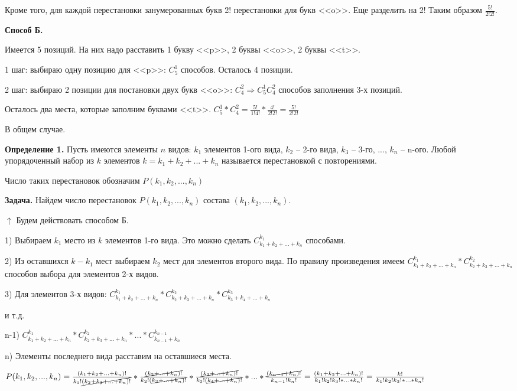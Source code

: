 \documentclass{article}
\begin{document}
    Кроме того, для каждой перестановки занумерованных букв 2! перестановки для букв <<o>>. Еще разделить на 2! Таким образом \(\frac{5!}{2!2!}\).

    \textbf{Способ Б.}

    Имеется 5 позиций. На них надо расставить 1 букву <<p>>, 2 буквы <<o>>, 2 буквы <<t>>.

    1 шаг: выбираю одну позицию для <<p>>: \(C_5^1\) способов. Осталось 4 позиции.

    2 шаг: выбираю 2 позиции для постановки двух букв <<o>>: \(C_4^2 \Rightarrow C_5^1C_4^2\) способов заполнения 3-х позиций.

    Осталось два места, которые заполним буквами <<t>>. \(C_5^1*C_4^2 = \frac{5!}{1!4!}*\frac{4!}{2!2!} = \frac{5!}{2!2!}\)

    В общем случае.

    \textbf{Определение 1.} Пусть имеются элементы \(n\) видов: \(k_1\) элементов 1-ого вида, \(k_2\) -- 2-го вида, \(k_3\) -- 3-го, ..., \(k_n\) -- n-ого. Любой упорядоченный набор из \(k\) элементов \(k = k_1 + k_2 + ... + k_n\) называется перестановкой с повторениями.

    Число таких перестановок обозначим \(P(k_1, k_2, ..., k_n)\)

    \textbf{Задача.} Найдем число перестановок \(P(k_1, k_2, ..., k_n)\) состава \((k_1, k_2, ..., k_n)\).
    
    \(\uparrow\) Будем действовать способом Б.

    1) Выбираем \(k_1\) место из \(k\) элементов 1-го вида. Это можно сделать \(C_{k_1+k_2+...+k_n}^{k_1}\) способами.

    2) Из оставшихся \(k - k_1\) мест выбираем \(k_2\) мест для элементов второго вида. По правилу произведения имеем \(C_{k_1+k_2+...+k_n}^{k_1}*C_{k_2+k_3+...+k_n}^{k_2}\) способов выбора для элементов 2-х видов.

    3) Для элементов 3-х видов: \(C_{k_1+k_2+...+k_n}^{k_1}*C_{k_2+k_3+...+k_n}^{k_2}*C_{k_3+k_4+...+k_n}^{k_3}\) 
    
    и т.д.

    n-1) \(C_{k_1+k_2+...+k_n}^{k_1}*C_{k_2+k_3+...+k_n}^{k_2}*...*C_{k_{n-1}+k_n}^{k_{n-1}}\)

    n) Элементы последнего вида расставим на оставшиеся места.

    \(P(k_1, k_2, ..., k_n) = \frac{(k_1 + k_2 + ... + k_n)!}{k_1!{\cancel{(k_2 + k_3 + ... + k_n)!}}}*\frac{\cancel{(k_2 + ... + k_n)!}}{k_2!(\cancel{k_3 + ... + k_n)!}}*\frac{\cancel{(k_3 + ... + k_n)!}}{k_3!(\cancel{k_4 + ... + k_n)!}}*...*\frac{\cancel{(k_{n-1} + k_n)!}}{k_{n-1}!k_n!}
    = \frac{(k_1 + k_2 + ... + k_n)!}{k_1!k_2!k_3!*...*k_n!} = \frac{k!}{k_1!k_2!k_3!*...*k_n!}\)
\end{document}

